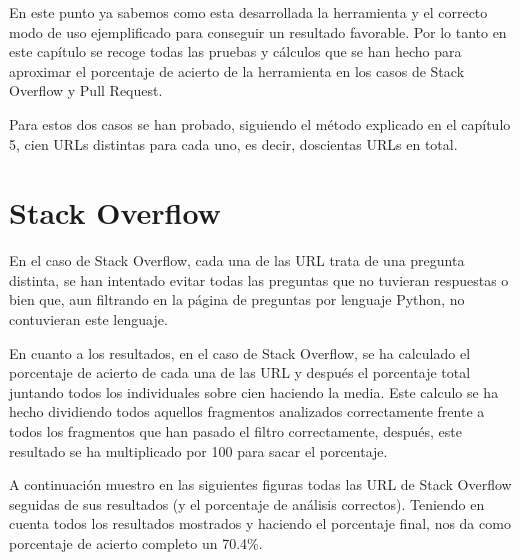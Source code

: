 \documentclass[a4paper, 12pt]{book}
\begin{document}
En este punto ya sabemos como esta desarrollada la herramienta y el correcto modo de uso ejemplificado para conseguir un resultado favorable. Por lo tanto en este capítulo se recoge todas las pruebas y cálculos que se han hecho para aproximar el porcentaje de acierto de la herramienta en los casos de Stack Overflow y Pull Request. 

Para estos dos casos se han probado, siguiendo el método explicado en el capítulo 5, cien URLs distintas para cada uno, es decir, doscientas URLs en total.

\section{Stack Overflow}

En el caso de Stack Overflow, cada una de las URL trata de una pregunta distinta, se han intentado evitar todas las preguntas que no tuvieran respuestas o bien que, aun filtrando en la página de preguntas por lenguaje Python, no contuvieran este lenguaje.

En cuanto a los resultados, en el caso de Stack Overflow, se ha calculado el porcentaje de acierto de cada una de las URL y después el porcentaje total juntando todos los individuales sobre cien haciendo la media. Este calculo se ha hecho dividiendo todos aquellos fragmentos analizados correctamente frente a todos los fragmentos que han pasado el filtro correctamente, después, este resultado se ha multiplicado por 100 para sacar el porcentaje. 

A continuación muestro en las siguientes figuras todas las URL de Stack Overflow seguidas de sus resultados (y el porcentaje de análisis correctos). Teniendo en cuenta todos los resultados mostrados y haciendo el porcentaje final, nos da como porcentaje de acierto completo un 70.4\%.
\end{document}

